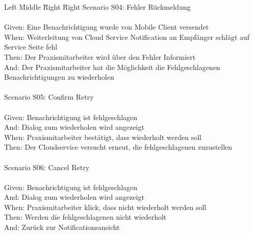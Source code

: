 \begin{tabbing}
    Left \= Middle \= Right \= Right  \kill
    Scenario S04: \> \> \>  Fehler Rückmeldung\\ \\
    Given: \> \> \>   Eine Benachrichtigung wurde von Mobile Client versendet\\
    When: \> \> \>    Weiterleitung von Cloud Service Notification an Empfänger schlägt auf Service Seite fehl\\
    Then: \> \> \>    Der Praxismitarbeiter wird über den Fehler Informiert\\
    And: \> \> \>     Der Praxismitarbeiter hat die Möglichkeit die Fehlgeschlagenen Benachrichtigungen zu wiederholen\\
    \\
    Scenario S05: \> \> \>  Confirm Retry\\ \\
    Given: \> \> \>   Benachrichtigung ist fehlgeschlagen\\
    And: \> \> \>     Dialog zum wiederholen wird angezeigt\\
    When: \> \> \>    Praxismitarbeiter bestätigt, dass wiederholt werden soll\\
    Then: \> \> \>    Der Cloudservice versucht erneut, die fehlgeschlagenen zuzustellen\\
    \\
    Scenario S06: \> \> \>  Cancel Retry\\ \\
    Given: \> \> \>   Benachrichtigung ist fehlgeschlagen\\
    And: \> \> \>     Dialog zum wiederholen wird angezeigt\\
    When: \> \> \>    Praxismitarbeiter klick, dass nicht wiederholt werden soll\\
    Then: \> \> \>    Werden die fehlgeschlagenen nicht wiederholt\\
    And: \> \> \>     Zurück zur Notificationsansicht\\

\end{tabbing}

